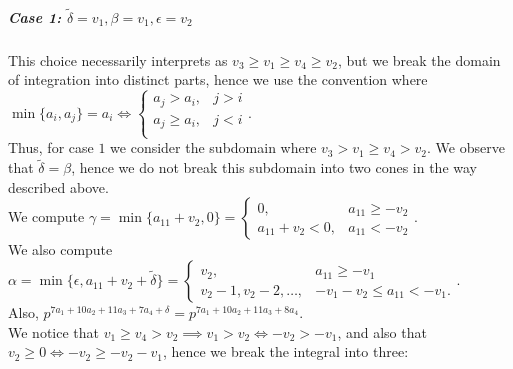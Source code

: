 \documentclass{article}
\begin{document}
\subparagraph{Case 1: $\tilde\delta=v_1,\beta=v_1,\epsilon=v_2$}
This choice necessarily interprets as $v_3\geq{v_1}\geq{v_4}\geq{v_2}$, but we break the domain of integration into distinct parts, hence we use the convention where
$\min\{a_i,a_j\}=a_i\iff\begin{cases}
    a_j>a_i,&j>i\\
    a_j\geq{a_i},&j<i\\
\end{cases}$.\\
Thus, for case $1$ we consider the subdomain where $v_3>v_1\geq{v_4}>v_2$. We observe that $\tilde\delta=\beta$, hence we do not break this subdomain into two cones in the way described above.\\
We compute $\gamma=\min\{a_{11}+v_2,0\}=\begin{cases}
    0,&a_{11}\geq-v_2\\
    a_{11}+v_2<0,&a_{11}<-v_2
\end{cases}$.\\
We also compute $\alpha=\min\{\epsilon,a_{11}+v_2+\tilde\delta\}=\begin{cases}
    v_2,&a_{11}\geq-v_1\\
    v_2-1,v_2-2,\dots,&-v_1-v_2\leq{a_{11}}<-v_1.
\end{cases}$.\\
Also, $p^{7a_1+10a_2+11a_3+7a_4+\delta}=p^{7a_1+10a_2+11a_3+8a_4}$.\\
We notice that $v_1\geq{v_4}>v_2\implies{v_1}>v_2\iff-v_2>-v_1$, and also that $v_2\geq{0}\iff-v_2\geq-v_2-v_1$, hence we break the integral into three:
\end{document}
